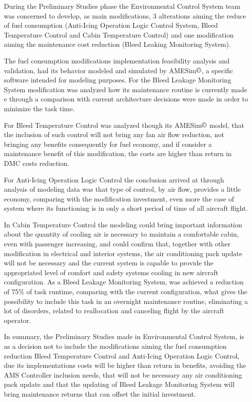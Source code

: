During the Preliminary Studies phase the Environmental Control System team was concerned to develop, as main modifications, 3 alterations aiming the reduce of fuel consumption (Anti-Icing Operation Logic Control System, Bleed Temperature Control and Cabin Temperature Control) and one modification aiming the maintenance cost reduction (Bleed Leaking Monitoring System).

The fuel consumption modifications implementation feasibility analysis and validation, had its behavior modeled and simulated by AMESim$\copyright$, a specific software intended for modeling purposes. For the Bleed Leakage Monitoring System modification was analyzed how its maintenance routine is currently made e through a comparison with current architecture decisions were made in order to minimize the task time.

For Bleed Temperature Control was analyzed though its AMESim$\copyright$ model, that the inclusion of such control will not bring any fan air flow reduction, not bringing any benefits consequently for fuel economy, and if consider a maintenance benefit of this modification, the costs are higher than return in DMC costs reduction.

For Anti-Icing Operation Logic Control the conclusion arrived at through analysis of modeling data was that type of control, by air flow, provides a little economy, comparing with the modification investment, even more the case of system where its functioning is in only a short period of time of all aircraft flight.

In Cabin Temperature Control the modeling could bring important information about the quantity of  cooling air is necessary to maintain a comfortable cabin, even with passenger increasing, and could confirm that, together with other modification in electrical and interior systems, the air conditioning pack update will not be necessary and the current system is capable to provide the appropriated level of comfort and safety systems cooling in new aircraft configuration. 
As a Bleed Leakage Monitoring System, was achieved a reduction of 75\% of task runtime, comparing with the current configuration, what gives the possibility to include this task in an overnight maintenance routine, eliminating a lot of disorders, related to reallocation and canceling flight by the aircraft operator.

In summary, the Preliminary Studies made in Environmental Control System, is as a decision not to include the modifications aiming the fuel consumption reduction Bleed Temperature Control and Anti-Icing Operation Logic Control, due its implementations costs will be higher than return in benefits, avoiding the AMS Controller inclusion needs,  that will not be necessary any air conditioning pack update and that the updating of Bleed Leakage Monitoring System will bring maintenance returns that can offset the initial investment.
